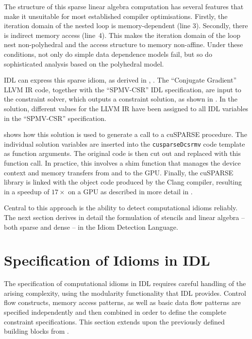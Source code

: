     The structure of this sparse linear algebra computation has several features
    that make it unsuitable for most established compiler optimisations.
    Firstly, the iteration domain of the nested loop is memory-dependent
    (line 3).
    Secondly, there is indirect memory access (line~4).
    This makes the iteration domain of the loop nest non-polyhedral
    and the access structure to memory non-affine.
    Under these conditions, not only do simple data dependence models fail,
    but so do sophisticated analysis based on the polyhedral model.

    IDL can express this sparse idiom, as derived in ,
    .
    The ``Conjugate Gradient'' LLVM IR code, together with the ``SPMV-CSR''
    IDL specification, are input to the constraint solver, which outputs a
    constraint solution, as shown in .
    In the solution, different values for the LLVM IR have been assigned to all
    IDL variables in the ``SPMV-CSR'' specification.

     shows how this solution is used to generate a
    call to a cuSPARSE procedure.
    The individual solution variables are inserted into the {\tt cusparseDcsrmv}
    code template as function arguments. 
    The original code is then cut out and replaced with this function call.
    In practice, this involves a shim function that manages the device context
    and memory transfers from and to the GPU.
    Finally, the cuSPARSE library is linked with the object code produced by the
    Clang compiler, resulting in a speedup of $17\times$ on a GPU as described
    in more detail in .

    Central to this approach is the ability to detect computational idioms
    reliably.
    The next section derives in detail the formulation of stencils and
    linear algebra -- both sparse and dense -- in the Idiom Detection Language.

\begin{figure}[p]
    
\end{figure}

\section{Specification of Idioms in IDL}
\label{sec:idioms}

    The specification of computational idioms in IDL requires careful
    handling of the arising complexity, using the modularity functionality that
    IDL provides.
    Control flow constructs, memory access patterns, as well as basic data flow
    patterns are specified independently and then combined in order to define
    the complete constraint specifications.
    This section extends upon the previously defined building blocks from
    .

